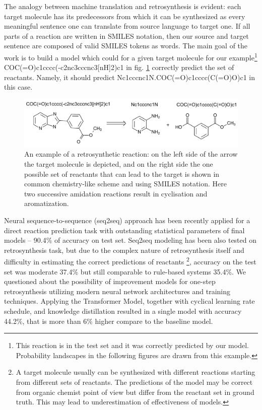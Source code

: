 \documentclass{article}
\begin{document}
The analogy between machine translation and retrosynthesis is evident: each target molecule has 
its predecessors from which it can be synthesized as every meaningful sentence one can translate 
from source language to target one. If all parts of a reaction are written in SMILES notation, 
then our source and target sentence are composed of valid SMILES tokens as words. 
The main goal of the work is to build a model which could for a given target molecule for our example\footnote{
This reaction is in the test set and it was correctly predicted  by our model. 
Probability landscapes in the following figures are drawn from this example.} COC(=O)c1cccc(-c2nc3cccnc3[nH]2)c1 in fig. \ref{fig:example-reaction}
correctly predict the set of reactants. Namely, it should predict Nc1cccnc1N.COC(=O)c1cccc(C(=O)O)c1 in this case.

\begin{figure}
  \centering
  \includegraphics[scale=0.87]{images/example-reaction.pdf}
  \caption{An example of a retrosynthetic reaction: on the left side of the arrow the target molecule is depicted, and on the right side the one possible set of reactants that can lead to the target is shown in common chemistry-like scheme and using SMILES notation. Here two successive amidation reactions result in cyclisation and aromatization.}
  \label{fig:example-reaction}
\end{figure}

Neural sequence-to-sequence (seq2seq) approach has been recently applied for a direct reaction 
prediction task \cite{SchwallerTranslation,SchwallerTransformer} with outstanding statistical 
parameters of final models -- 90.4\% of accuracy on test set. Seq2seq modeling has been also tested on 
retrosynthesis task\cite{Pande}, but due to the complex nature of retrosynthesis itself 
and difficulty in estimating the correct predictions of reactants
\footnote{A target molecule usually can be synthesized with different reactions starting from different sets of reactants. 
The predictions of the model may be correct from organic chemist point of view but differ from 
the reactant set in ground truth. This may lead to underestimation of effectiveness of models.}, 
accuracy on the test set was moderate 37.4\% but still comparable to rule-based systems 35.4\%. 
We questioned about the possibility of improvement models for one-step retrosynthesis utilizing modern neural network architectures 
and training techniques. Applying the Transformer Model\cite{Transformer}, 
together with cyclical learning rate schedule\cite{TransformerTips}, 
and knowledge distillation\cite{Hinton} resulted in a single model with accuracy 44.2\%, 
that is more than 6\% higher compare to the baseline model\cite{Pande}.  
\end{document}
